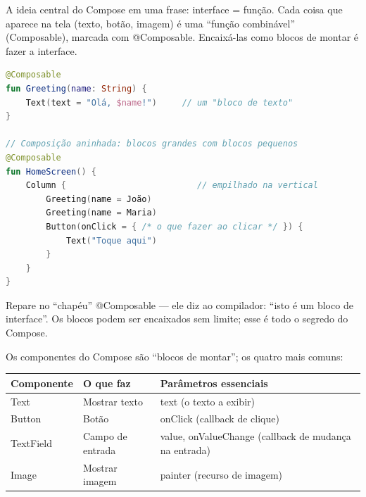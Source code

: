 


A ideia central do Compose em uma frase: interface = função. Cada coisa que aparece na tela (texto, botão, imagem) é uma “função combinável” (Composable), marcada com @Composable. Encaixá-las como blocos de montar é fazer a interface.

\begin{lstlisting}[language=Kotlin]
@Composable
fun Greeting(name: String) {
    Text(text = "Olá, $name!")     // um "bloco de texto"
}

// Composição aninhada: blocos grandes com blocos pequenos
@Composable
fun HomeScreen() {
    Column {                          // empilhado na vertical
        Greeting(name = João)
        Greeting(name = Maria)
        Button(onClick = { /* o que fazer ao clicar */ }) {
            Text("Toque aqui")
        }
    }
}
\end{lstlisting}

Repare no “chapéu” @Composable — ele diz ao compilador: “isto é um bloco de interface”. Os blocos podem ser encaixados sem limite; esse é todo o segredo do Compose.


Os componentes do Compose são “blocos de montar”; os quatro mais comuns:

\begin{center}
\begin{tabularx}{\linewidth}{|X|X|X|}
\hline
\textbf{Componente} & \textbf{O que faz} & \textbf{Parâmetros essenciais} \tabularnewline
\hline
Text & Mostrar texto & text (o texto a exibir) \tabularnewline
Button & Botão & onClick (callback de clique) \tabularnewline
TextField & Campo de entrada & value, onValueChange (callback de mudança na entrada) \tabularnewline
Image & Mostrar imagem & painter (recurso de imagem) \tabularnewline
\hline
\end{tabularx}
\end{center}

